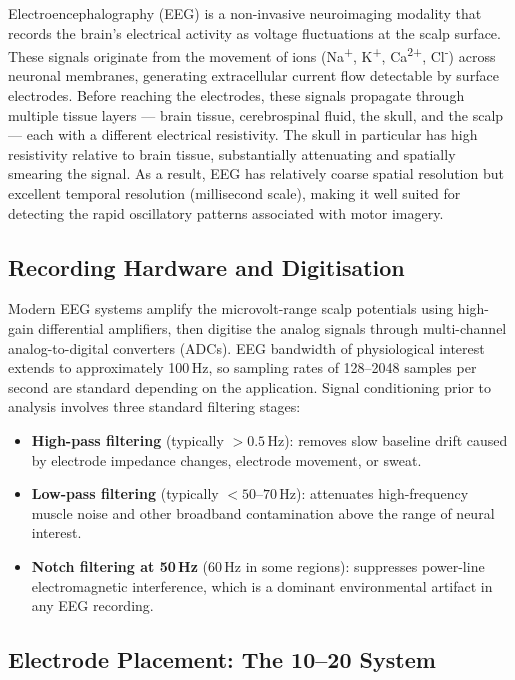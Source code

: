 \documentclass[12pt, a4paper, oneside]{report}
\begin{document}
Electroencephalography (EEG) is a non-invasive neuroimaging modality that records
the brain's electrical activity as voltage fluctuations at the scalp surface. These
signals originate from the movement of ions (Na\textsuperscript{+},
K\textsuperscript{+}, Ca\textsuperscript{2+}, Cl\textsuperscript{-}) across
neuronal membranes, generating extracellular current flow detectable by surface
electrodes. Before reaching the electrodes, these signals propagate through multiple
tissue layers --- brain tissue, cerebrospinal fluid, the skull, and the scalp ---
each with a different electrical resistivity. The skull in particular has high
resistivity relative to brain tissue, substantially attenuating and spatially
smearing the signal. As a result, EEG has relatively coarse spatial resolution but
excellent temporal resolution (millisecond scale), making it well suited for
detecting the rapid oscillatory patterns associated with motor imagery.

\subsection{Recording Hardware and Digitisation}

Modern EEG systems amplify the microvolt-range scalp potentials using
high-gain differential amplifiers, then digitise the analog signals through
multi-channel analog-to-digital converters (ADCs). EEG bandwidth of physiological
interest extends to approximately 100\,Hz, so sampling rates of 128--2048 samples
per second are standard depending on the application. Signal conditioning prior to
analysis involves three standard filtering stages:

\begin{itemize}
  \item \textbf{High-pass filtering} (typically $>0.5$\,Hz): removes slow
        baseline drift caused by electrode impedance changes, electrode movement,
        or sweat.
  \item \textbf{Low-pass filtering} (typically $<50$--$70$\,Hz): attenuates
        high-frequency muscle noise and other broadband contamination above the
        range of neural interest.
  \item \textbf{Notch filtering at 50\,Hz} (60\,Hz in some regions): suppresses
        power-line electromagnetic interference, which is a dominant environmental
        artifact in any EEG recording.
\end{itemize}

\subsection{Electrode Placement: The 10--20 System}
\end{document}
